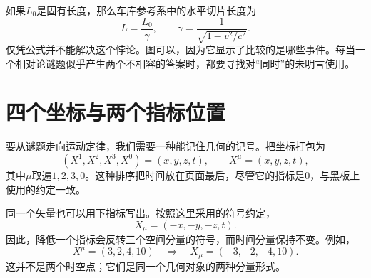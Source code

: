 \begin{classroomqa}
\end{classroomqa}

如果\(L_0\)是固有长度，那么车库参考系中的水平切片长度为\begin{equation}
L=\frac{L_0}{\gamma},
\qquad
\gamma=\frac{1}{\sqrt{1-v^2/c^2}}.
\end{equation}
仅凭公式并不能解决这个悖论。图可以，因为它显示了比较的是哪些事件。每当一个相对论谜题似乎产生两个不相容的答案时，都要寻找对``同时''的未明言使用。

\section{四个坐标与两个指标位置}

要从谜题走向运动定律，我们需要一种能记住几何的记号。把坐标打包为
\begin{equation}
(X^1,X^2,X^3,X^0)=(x,y,z,t),
\qquad X^\mu=(x,y,z,t),
\end{equation}
其中\(\mu\)取遍\(1,2,3,0\)。这种排序把时间放在页面最后，尽管它的指标是\(0\)，与黑板上使用的约定一致。

\begin{classroomqa}
\end{classroomqa}

同一个矢量也可以用下指标写出。按照这里采用的符号约定，
\begin{equation}
X_\mu=(-x,-y,-z,t).
\end{equation}
因此，降低一个指标会反转三个空间分量的符号，而时间分量保持不变。例如，
\begin{equation}
X^\mu=(3,2,4,10)
\quad\Longrightarrow\quad
X_\mu=(-3,-2,-4,10).
\end{equation}
这并不是两个时空点；它们是同一个几何对象的两种分量形式。

\begin{classroomqa}
\end{classroomqa}

